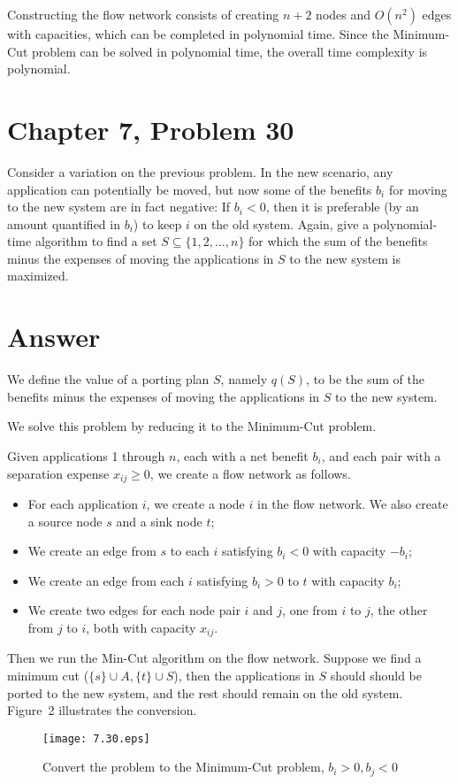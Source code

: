 \documentclass[12pt,letterpaper]{article}
\begin{document}
Constructing the flow network consists of creating $n+2$ nodes and $O(n^2)$ edges with capacities, which can be completed in polynomial time. Since the Minimum-Cut problem can be solved in polynomial time, the overall time complexity is polynomial.

\section*{Chapter 7, Problem 30}
Consider a variation on the previous problem. In the new scenario, any
application can potentially be moved, but now some of the benefits $b_i$ for
moving to the new system are in fact negative: If $b_i < 0$, then it is preferable
(by an amount quantified in $b_i$) to keep $i$ on the old system. Again, give
a polynomial-time algorithm to find a set $S \subseteq \{1, 2, \dots, n\}$ for which the
sum of the benefits minus the expenses of moving the applications in $S$
to the new system is maximized.

\section*{Answer}
We define the value of a porting plan $S$, namely $q(S)$, to be the sum of the benefits minus the
expenses of moving the applications in $S$ to the new system.

We solve this problem by reducing it to the Minimum-Cut problem.

Given applications 1 through $n$, each with a net benefit $b_i$, and each pair with a separation expense $x_{ij} \ge 0$, we create a flow network as follows.
\begin{itemize}
\item For each application $i$, we create a node $i$ in the flow network. We also create a source node $s$ and a sink node $t$;
\item We create an edge from $s$ to each $i$ satisfying $b_i<0$ with capacity $-b_i$;
\item We create an edge from each $i$ satisfying $b_i>0$ to $t$ with capacity $b_i$;
\item We create two edges for each node pair $i$ and $j$, one from $i$ to $j$, the other from $j$ to $i$, both with capacity $x_{ij}$.
\end{itemize}

Then we run the Min-Cut algorithm on the flow network. Suppose we find a minimum cut ($\{s\}\cup A, \{t\}\cup S$), then the applications in $S$ should should be ported to the new system, and the rest should remain on the old system. Figure~2 illustrates the conversion.
\begin{figure}
\begin{center}
\texttt{[image: 7.30.eps]}
\caption{Convert the problem to the Minimum-Cut problem, $b_i>0, b_j<0$}
\end{center}
\end{figure}
\end{document}
